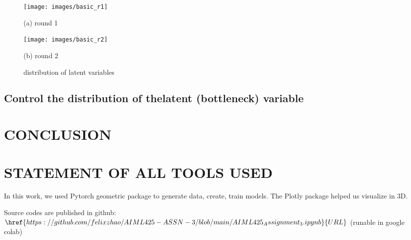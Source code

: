 \documentclass{article}
\begin{document}
\begin{figure}[htb]
  \begin{minipage}[b]{1.0\linewidth}
    \centering
    \centerline{\texttt{[image: images/basic\_r1]}}
    \centerline{(a) round 1}\medskip
  \end{minipage}
  \hfill
  \begin{minipage}[b]{1.0\linewidth}
    \centering
    \centerline{\texttt{[image: images/basic\_r2]}}
    \centerline{(b) round 2 }\medskip
  \end{minipage}
  \caption{distribution of latent variables}
  \label{fig:basic}
  \end{figure}

\subsection{Control the distribution of thelatent (bottleneck) variable}
\label{ssec:VAE}


\section{CONCLUSION}
\label{sec:conclusion}


\section{STATEMENT OF ALL TOOLS USED}
\label{sec:statementofalltoolsused}

In this work, we used Pytorch geometric package to generate data, create, train models. 
The Plotly package helped us visualize in 3D. 

Source codes are published in github: 
$\href{https://github.com/felixzhao/AIML425-ASSN-3/blob/main/AIML425_Assignment_3.ipynb}{URL}$
 (runable in google colab)




\vfill\pagebreak



\end{document}
